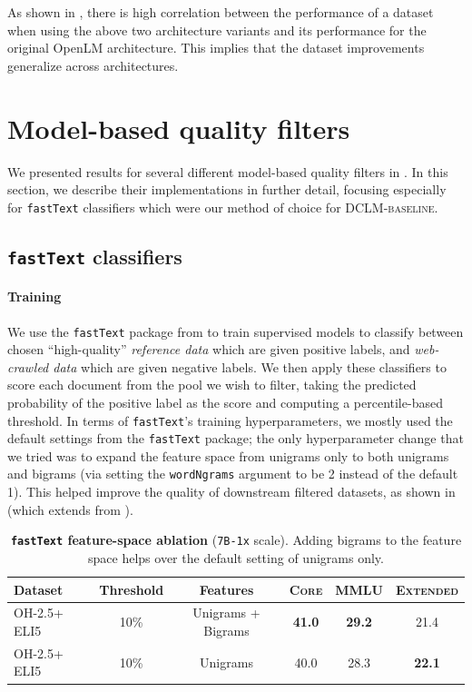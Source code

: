 \documentclass{article}
\newcommand{\hqpool}{\textsc{DCLM-baseline}\xspace}
\newcommand{\oh}{\textsc{OH-2.5}\xspace}
\newcommand{\ltrack}{\texttt{7B-1x}\xspace}
\newcommand{\fasttext}{\texttt{fastText}\xspace}
\newcommand{\lowvar}{\textsc{Core}\xspace}
\newcommand{\aggscore}{\textsc{Extended}\xspace}
\begin{document}
As shown in , there is high correlation between the performance of a dataset when using the above two architecture variants and its performance for the original OpenLM architecture.
This implies that the dataset improvements generalize across architectures.


\section{Model-based quality filters}\label{appx:quality-filters}

We presented results for several different model-based quality filters in . In this section, we describe their implementations in further detail, focusing especially for \fasttext classifiers which were our method of choice for \hqpool.

\subsection{\fasttext classifiers}


\paragraph{Training} We use the \fasttext package from \citet{joulin2017bag} to train supervised models to classify between chosen ``high-quality'' \textit{reference data} which are given positive labels, and \textit{web-crawled data} which are given negative labels. We then apply these classifiers to score each document from the pool we wish to filter, taking the predicted probability of the positive label as the score and computing a percentile-based threshold. In terms of \fasttext's training hyperparameters, we mostly used the default settings from the \fasttext package; the only hyperparameter change that we tried was to expand the feature space from unigrams only to both unigrams and bigrams (via setting the \texttt{wordNgrams} argument to be 2 instead of the default 1). This helped improve the quality of downstream filtered datasets, as shown in  (which extends  from ).

\begin{table}[h]
\centering
\caption{\textbf{\fasttext feature-space ablation} (\ltrack{} scale). Adding bigrams to the feature space helps over the default setting of unigrams only. }
\label{tab:fasttext_ablations_features}
\begin{tabular}{lccccc}
\toprule
     Dataset & Threshold &  Features &   \lowvar &          MMLU &     \aggscore \\
\midrule
    \oh + ELI5 &      10\% & Unigrams + Bigrams& \textbf{41.0} & \textbf{29.2} &          21.4 \\
     \oh + ELI5 &      10\% &   Unigrams &       40.0 &          28.3 & \textbf{22.1} \\
\bottomrule
\end{tabular}
\end{table}
\end{document}
